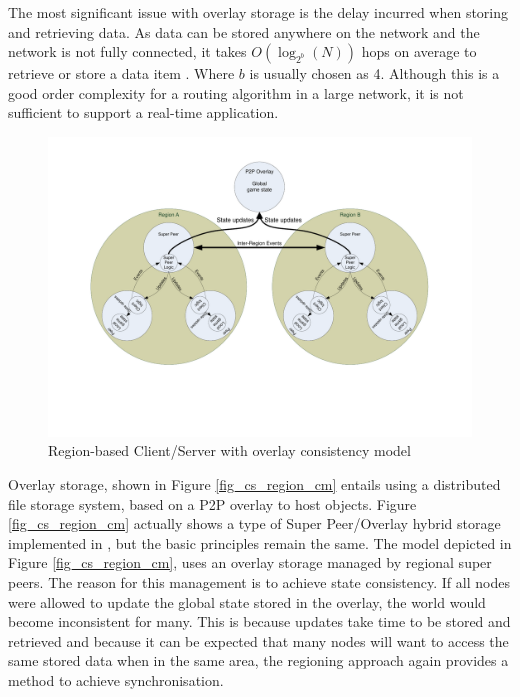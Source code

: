 \documentclass[journal,oneside,a4paper,onecolumn]{IEEEtran}
\begin{document}
The most significant issue with overlay storage is the delay incurred when storing and retrieving data. As data can be stored anywhere on the network and the network is not fully connected, it takes $O(\log_{2^b}(N))$ hops on average to retrieve or store a data item \cite{storage_and_chaching_PAST}. Where $b$ is usually chosen as 4. Although this is a good order complexity for a routing algorithm in a large network, it is not sufficient to support a real-time application.

\begin{figure}[htbp]
 \centering
 \includegraphics[clip=true, viewport=2cm 5cm 27cm 19.5cm, width=\columnwidth]{region_based_CS_CM_P2PO}
 \caption{Region-based Client/Server with overlay consistency model}
 \label{fig_cs_region_o_cm}
\end{figure}
%
Overlay storage, shown in Figure \ref{fig_cs_region_cm} entails using a distributed file storage system, based on a P2P overlay to host objects. Figure \ref{fig_cs_region_cm} actually shows a type of Super Peer/Overlay hybrid storage implemented in \cite{zoned_federation}, but the basic principles remain the same. The model depicted in Figure \ref{fig_cs_region_cm}, uses an overlay storage managed by regional super peers. The reason for this management is to achieve state consistency. If all nodes were allowed to update the global state stored in the overlay, the world would become inconsistent for many. This is because updates take time to be stored and retrieved and because it can be expected that many nodes will want to access the same stored data when in the same area, the regioning approach again provides a method to achieve synchronisation.
\end{document}
